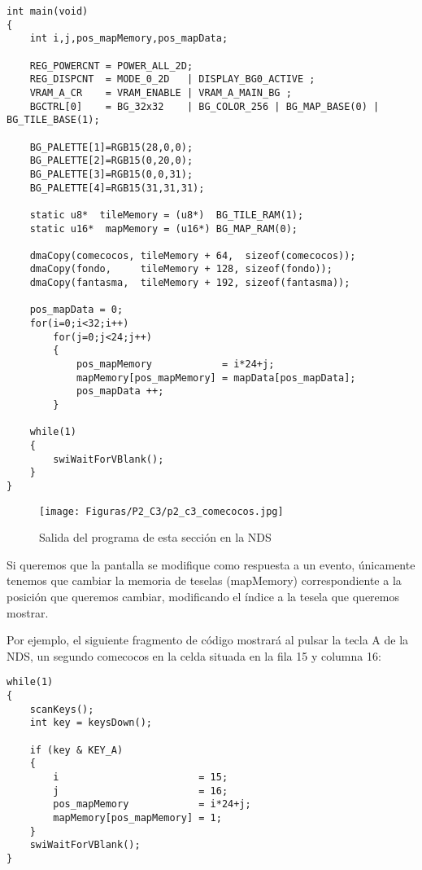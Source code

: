 \begin{lstlisting}
int main(void)
{
	int i,j,pos_mapMemory,pos_mapData;

	REG_POWERCNT = POWER_ALL_2D;
	REG_DISPCNT  = MODE_0_2D   | DISPLAY_BG0_ACTIVE ;
	VRAM_A_CR    = VRAM_ENABLE | VRAM_A_MAIN_BG ;
	BGCTRL[0]    = BG_32x32    | BG_COLOR_256 | BG_MAP_BASE(0) | BG_TILE_BASE(1);

	BG_PALETTE[1]=RGB15(28,0,0);
	BG_PALETTE[2]=RGB15(0,20,0);
	BG_PALETTE[3]=RGB15(0,0,31);
	BG_PALETTE[4]=RGB15(31,31,31);

	static u8*  tileMemory = (u8*)  BG_TILE_RAM(1);
	static u16*  mapMemory = (u16*) BG_MAP_RAM(0);

	dmaCopy(comecocos, tileMemory + 64,  sizeof(comecocos));
	dmaCopy(fondo,     tileMemory + 128, sizeof(fondo));
	dmaCopy(fantasma,  tileMemory + 192, sizeof(fantasma));

	pos_mapData = 0;
	for(i=0;i<32;i++)
		for(j=0;j<24;j++)
		{
			pos_mapMemory            = i*24+j;
			mapMemory[pos_mapMemory] = mapData[pos_mapData];
			pos_mapData ++;
		}

	while(1)
	{
		swiWaitForVBlank();
	}
}
\end{lstlisting}

\begin{figure}[t]
	\centering
	\texttt{[image: Figuras/P2\_C3/p2\_c3\_comecocos.jpg]}
	\caption{Salida del programa de esta sección en la NDS}
	\label{fig_p2_c3_comecocos}
\end{figure}

Si queremos que la pantalla se modifique como respuesta a un evento, únicamente tenemos que cambiar la memoria de teselas (mapMemory) correspondiente a la posición que queremos cambiar, modificando el índice a la tesela que queremos mostrar.

Por ejemplo, el siguiente fragmento de código mostrará al pulsar la tecla A de la NDS, un segundo comecocos en la celda situada en la fila 15 y columna 16:

\begin{lstlisting}
while(1)
{
	scanKeys();
	int key = keysDown();

	if (key & KEY_A)
	{
		i                        = 15;
		j                        = 16;
		pos_mapMemory            = i*24+j;
		mapMemory[pos_mapMemory] = 1;
	}
	swiWaitForVBlank();
}
\end{lstlisting}


